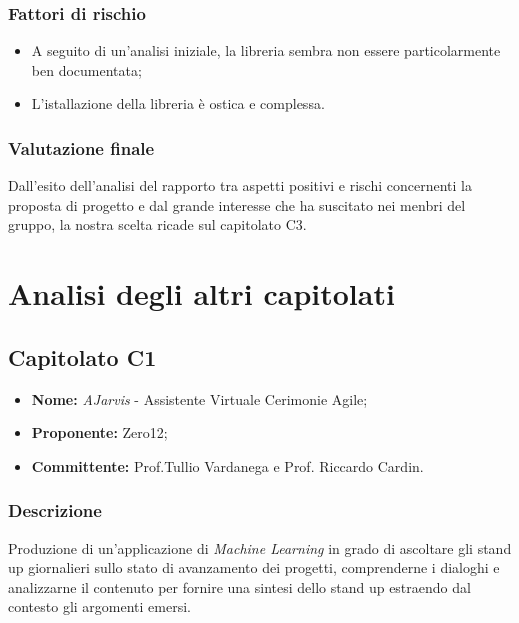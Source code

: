 \documentclass[openany,12pt,a4paper]{report}
\begin{document}
	\subsection{Fattori di rischio}

	\begin{itemize}
		\item A seguito di un'analisi iniziale, la libreria sembra non essere particolarmente ben documentata;

		\item L'istallazione della libreria è ostica e complessa.
	\end{itemize}

	\subsection{Valutazione finale}

	Dall'esito dell'analisi del rapporto tra aspetti positivi e rischi concernenti la proposta di progetto e dal grande interesse che ha suscitato nei menbri del gruppo, la nostra scelta ricade sul capitolato C3.

	\chapter{Analisi degli altri capitolati}


	\section{Capitolato C1}

	\begin{itemize}
		\item \textbf{Nome:} \textit{AJarvis} - Assistente Virtuale Cerimonie Agile;
		\item \textbf{Proponente:} Zero12;
		\item \textbf{Committente:} Prof.Tullio Vardanega e Prof. Riccardo Cardin.
	\end{itemize}

	\subsection{Descrizione}

	Produzione di un’applicazione di \textit{Machine Learning} in grado di ascoltare gli stand up giornalieri sullo stato di avanzamento dei progetti, comprenderne i dialoghi e analizzarne il contenuto per fornire una sintesi dello stand up estraendo dal contesto gli argomenti emersi.
\end{document}
